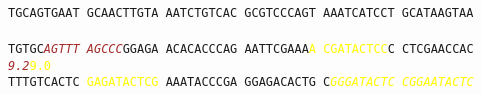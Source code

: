 \documentclass[11pt,twoside,reqno,a4paper]{article}
\begin{document}
 \\
\texttt{TGCAGTGAAT	GCAACTTGTA	AATCTGTCAC	GCGTCCCAGT	AAATCATCCT	GCATAAGTAA	\\
\hspace*{1\charwidth}\hspace*{1\charwidth}\hspace*{1\charwidth}\hspace*{1\charwidth}\hspace*{1\charwidth}\hspace*{1\charwidth}\\
TGTGC\textit{\textcolor{Brown}{A}}\textit{\textcolor{Brown}{G}}\textit{\textcolor{Brown}{T}}\textit{\textcolor{Brown}{T}}\textit{\textcolor{Brown}{T}}	\textit{\textcolor{Brown}{A}}\textit{\textcolor{Brown}{G}}\textit{\textcolor{Brown}{C}}\textit{\textcolor{Brown}{C}}\textit{\textcolor{Brown}{C}}GGAGA	ACACACCCAG	AATTCGAAA\textcolor{Yellow}{A}	\textcolor{Yellow}{C}\textcolor{Yellow}{G}\textcolor{Yellow}{A}\textcolor{Yellow}{T}\textcolor{Yellow}{A}\textcolor{Yellow}{C}\textcolor{Yellow}{T}\textcolor{Yellow}{C}\textcolor{Yellow}{C}C	CTCGAACCAC	\\
\hspace*{5\charwidth}\textit{\textcolor{Brown}{9.2}}\hspace*{1\charwidth}\hspace*{1\charwidth}\hspace*{1\charwidth}\hspace*{30\charwidth}\textcolor{Yellow}{9.0}\hspace*{1\charwidth}\hspace*{1\charwidth}\hspace*{1\charwidth}\\
TTTGTCACTC	\textcolor{Yellow}{G}\textcolor{Yellow}{A}\textcolor{Yellow}{G}\textcolor{Yellow}{A}\textcolor{Yellow}{T}\textcolor{Yellow}{A}\textcolor{Yellow}{C}\textcolor{Yellow}{T}\textcolor{Yellow}{C}\textcolor{Yellow}{G}	AAATACCCGA	GGAGACACTG	C\textit{\textcolor{Yellow}{G}}\textit{\textcolor{Yellow}{G}}\textit{\textcolor{Yellow}{G}}\textit{\textcolor{Yellow}{A}}\textit{\textcolor{Yellow}{T}}\textit{\textcolor{Yellow}{A}}\textit{\textcolor{Yellow}{C}}\textit{\textcolor{Yellow}{T}}\textit{\textcolor{Yellow}{C}}	\textit{\textcolor{Yellow}{C}}\textit{\textcolor{Yellow}{G}}\textit{\textcolor{Yellow}{G}}\textit{\textcolor{Yellow}{A}}\textit{\textcolor{Yellow}{A}}\textit{\textcolor{Yellow}{T}}\textit{\textcolor{Yellow}{A}}\textit{\textcolor{Yellow}{C}}\textit{\textcolor{Yellow}{T}}\textit{\textcolor{Yellow}{C}}	\\
}
\end{document}
